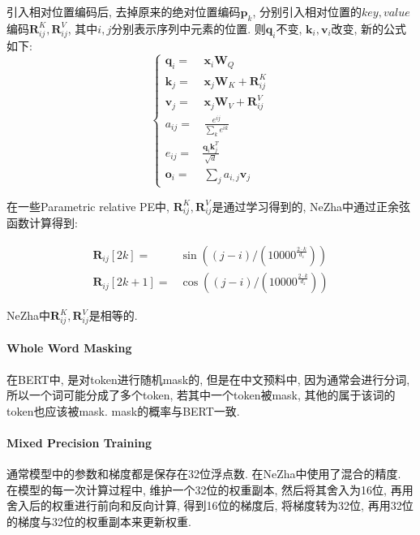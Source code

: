 引入相对位置编码后, 去掉原来的绝对位置编码$\boldsymbol{p}_k$, 分别引入相对位置的$key, value$编码$\boldsymbol{R}_{ij}^K, \boldsymbol{R}_{ij}^V$, 其中$i, j$分别表示序列中元素的位置. 则$\boldsymbol{q}_i$不变, $\boldsymbol{k}_i, \boldsymbol{v}_i$改变, 新的公式如下: 
$$
\begin{equation}\nonumber
	\left\{
	\begin{aligned} 
		\boldsymbol{q}_i =&\, \boldsymbol{x}_i \boldsymbol{W}_Q \\ 
		\boldsymbol{k}_j =&\, \boldsymbol{x}_j \boldsymbol{W}_K + \boldsymbol{R}_{ij}^K \\ 
		\boldsymbol{v}_j =&\, \boldsymbol{x}_j \boldsymbol{W}_V + \boldsymbol{R}_{ij}^V \\ 
		a_{ij} =&\, \frac{e^{ij}}{\sum_k e^{ik}}\\ 
		e_{ij} =& \frac{\boldsymbol{q}_i \boldsymbol{k}_j^T}{\sqrt{d}}\\
		\boldsymbol{o}_i =&\, \sum_j a_{i,j}\boldsymbol{v}_j 
	\end{aligned}\right.
\end{equation}
$$

在一些Parametric relative PE中, $\boldsymbol{R}_{ij}^K, \boldsymbol{R}_{ij}^V$是通过学习得到的, NeZha中通过正余弦函数计算得到: 

\begin{equation}
	\begin{aligned}
		\boldsymbol{R}_{ij}[2 k] =& \sin \left((j-i) /\left(10000^{\frac{2 \cdot k}{d_{z}}}\right)\right) \\
		\boldsymbol{R}_{ij}[2 k+1] =& \cos \left((j-i) /\left(10000^{\frac{2 \cdot k}{d_{z}}}\right)\right)
	\end{aligned}
\end{equation}

NeZha中$\boldsymbol{R}_{ij}^K, \boldsymbol{R}_{ij}^V$是相等的. 

\paragraph{Whole Word Masking}
在BERT中, 是对token进行随机mask的, 但是在中文预料中, 因为通常会进行分词, 所以一个词可能分成了多个token, 若其中一个token被mask, 其他的属于该词的token也应该被mask. mask的概率与BERT一致. 

\paragraph{Mixed Precision Training}
通常模型中的参数和梯度都是保存在32位浮点数. 在NeZha中使用了混合的精度. 在模型的每一次计算过程中, 维护一个32位的权重副本, 然后将其舍入为16位, 再用舍入后的权重进行前向和反向计算, 得到16位的梯度后, 将梯度转为32位, 再用32位的梯度与32位的权重副本来更新权重. 


